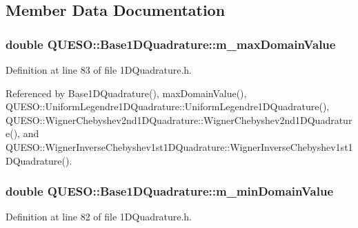 \subsection{Member Data Documentation}
\hypertarget{class_q_u_e_s_o_1_1_base1_d_quadrature_ace30af8dd67b04f11ea37ebe509f256e}{
\subsubsection[{m\-\_\-max\-Domain\-Value}]{\setlength{\rightskip}{0pt plus 5cm}double Q\-U\-E\-S\-O\-::\-Base1\-D\-Quadrature\-::m\-\_\-max\-Domain\-Value\hspace{0.3cm}{\ttfamily [protected]}}}\label{class_q_u_e_s_o_1_1_base1_d_quadrature_ace30af8dd67b04f11ea37ebe509f256e}


Definition at line 83 of file 1\-D\-Quadrature.\-h.



Referenced by Base1\-D\-Quadrature(), max\-Domain\-Value(), Q\-U\-E\-S\-O\-::\-Uniform\-Legendre1\-D\-Quadrature\-::\-Uniform\-Legendre1\-D\-Quadrature(), Q\-U\-E\-S\-O\-::\-Wigner\-Chebyshev2nd1\-D\-Quadrature\-::\-Wigner\-Chebyshev2nd1\-D\-Quadrature(), and Q\-U\-E\-S\-O\-::\-Wigner\-Inverse\-Chebyshev1st1\-D\-Quadrature\-::\-Wigner\-Inverse\-Chebyshev1st1\-D\-Quadrature().

\hypertarget{class_q_u_e_s_o_1_1_base1_d_quadrature_a7165680498394fa2d23ac919a920fc01}{
\subsubsection[{m\-\_\-min\-Domain\-Value}]{\setlength{\rightskip}{0pt plus 5cm}double Q\-U\-E\-S\-O\-::\-Base1\-D\-Quadrature\-::m\-\_\-min\-Domain\-Value\hspace{0.3cm}{\ttfamily [protected]}}}\label{class_q_u_e_s_o_1_1_base1_d_quadrature_a7165680498394fa2d23ac919a920fc01}


Definition at line 82 of file 1\-D\-Quadrature.\-h.



